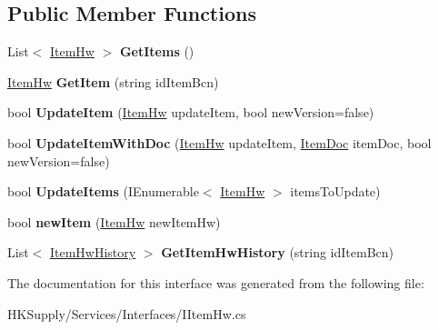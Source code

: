 \subsection*{Public Member Functions}
\begin{DoxyCompactItemize}
\item 
\mbox{\label{interface_h_k_supply_1_1_services_1_1_interfaces_1_1_i_item_hw_a9d36e376f859d46e6647d5dc19be7690}} 
List$<$ \mbox{\hyperlink{class_h_k_supply_1_1_models_1_1_item_hw}{Item\+Hw}} $>$ {\bfseries Get\+Items} ()
\item 
\mbox{\label{interface_h_k_supply_1_1_services_1_1_interfaces_1_1_i_item_hw_a291a3019850bbd56f73db802b21d340a}} 
\mbox{\hyperlink{class_h_k_supply_1_1_models_1_1_item_hw}{Item\+Hw}} {\bfseries Get\+Item} (string id\+Item\+Bcn)
\item 
\mbox{\label{interface_h_k_supply_1_1_services_1_1_interfaces_1_1_i_item_hw_a38d0041b81ac89093d21e152536f4682}} 
bool {\bfseries Update\+Item} (\mbox{\hyperlink{class_h_k_supply_1_1_models_1_1_item_hw}{Item\+Hw}} update\+Item, bool new\+Version=false)
\item 
\mbox{\label{interface_h_k_supply_1_1_services_1_1_interfaces_1_1_i_item_hw_a6351a755e87dffe3c253ae9ea9e22ec9}} 
bool {\bfseries Update\+Item\+With\+Doc} (\mbox{\hyperlink{class_h_k_supply_1_1_models_1_1_item_hw}{Item\+Hw}} update\+Item, \mbox{\hyperlink{class_h_k_supply_1_1_models_1_1_item_doc}{Item\+Doc}} item\+Doc, bool new\+Version=false)
\item 
\mbox{\label{interface_h_k_supply_1_1_services_1_1_interfaces_1_1_i_item_hw_a22088f2805804e92d5cd1f9987be8f24}} 
bool {\bfseries Update\+Items} (I\+Enumerable$<$ \mbox{\hyperlink{class_h_k_supply_1_1_models_1_1_item_hw}{Item\+Hw}} $>$ items\+To\+Update)
\item 
\mbox{\label{interface_h_k_supply_1_1_services_1_1_interfaces_1_1_i_item_hw_a3147afb9ffade7f9bbc5c455e3ea59bf}} 
bool {\bfseries new\+Item} (\mbox{\hyperlink{class_h_k_supply_1_1_models_1_1_item_hw}{Item\+Hw}} new\+Item\+Hw)
\item 
\mbox{\label{interface_h_k_supply_1_1_services_1_1_interfaces_1_1_i_item_hw_ab01b9358c34defcef485839c8f8d6a2d}} 
List$<$ \mbox{\hyperlink{class_h_k_supply_1_1_models_1_1_item_hw_history}{Item\+Hw\+History}} $>$ {\bfseries Get\+Item\+Hw\+History} (string id\+Item\+Bcn)
\end{DoxyCompactItemize}


The documentation for this interface was generated from the following file\+:\begin{DoxyCompactItemize}
\item 
H\+K\+Supply/\+Services/\+Interfaces/I\+Item\+Hw.\+cs\end{DoxyCompactItemize}
